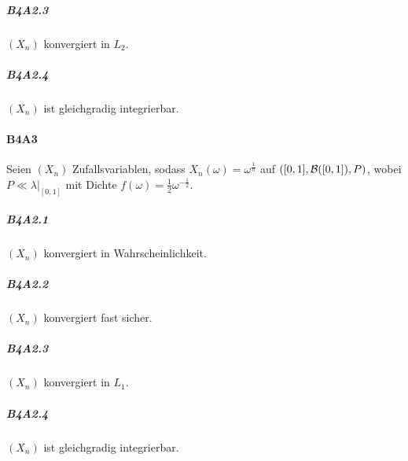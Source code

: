 \documentclass{article}
\begin{document}
\subparagraph{B4A2.3} $(X_n)$ konvergiert in $L_2$.

\subparagraph{B4A2.4} $(X_n)$ ist gleichgradig integrierbar.
\newpage

\paragraph{B4A3} Seien $(X_n)$ Zufallsvariablen, sodass $X_n(\omega)=\omega^{\frac{1}{n}}$ auf $([0,1],{\cal B}([0,1]),P)$, wobei $P\ll\lambda|_{[0,1]}$ mit Dichte $f(\omega)=\frac{1}{2}\omega^{-\frac{1}{2}}$.
\subparagraph{B4A2.1} $(X_n)$ konvergiert in Wahrscheinlichkeit.

\subparagraph{B4A2.2} $(X_n)$ konvergiert fast sicher.

\subparagraph{B4A2.3} $(X_n)$ konvergiert in $L_1$.

\subparagraph{B4A2.4} $(X_n)$ ist gleichgradig integrierbar.
\newpage


\end{document}
